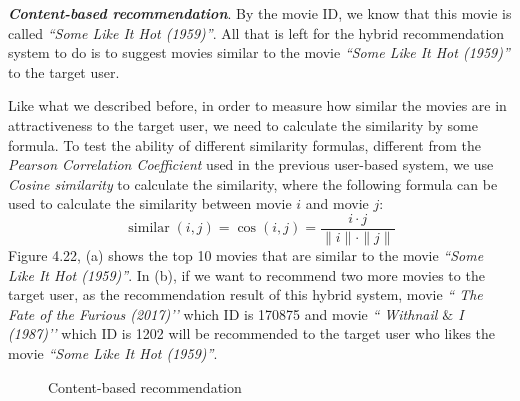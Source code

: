 \textbf{\textit{Content-based recommendation}}. By the movie ID, we know that this movie is called \textit{``Some Like It Hot (1959)''}. All that is left for the hybrid recommendation system to do is to suggest movies similar to the movie \textit{``Some Like It Hot (1959)''} to the target user. 

Like what we described before, in order to measure how similar the movies are in attractiveness to the target user, we need to calculate the similarity by some formula. To test the ability of different similarity formulas, different from the \textit{Pearson Correlation Coefficient} used in the previous user-based system, we use \textit{Cosine similarity} to calculate the similarity, where the following formula can be used to calculate the similarity between movie $i$ and movie $j$:
\begin{equation}
\operatorname{similar}(i, j)=\cos (i, j)=\frac{i \cdot j}{\|i\| \cdot\|j\|}
\end{equation}
Figure 4.22, (a) shows the top 10 movies that are similar to the movie \textit{``Some Like It Hot (1959)''}. In (b), if we want to recommend two more movies to the target user, as the recommendation result of this hybrid system, movie \textit{`` The Fate of the Furious (2017)’’} which ID is 170875 and movie \textit{`` Withnail $\&$ I (1987)’’} which ID is 1202 will be recommended to the target user who likes the movie \textit{``Some Like It Hot (1959)''}.

\begin{figure}[htbp]
\centering
{}%
%
\centering
\caption{Content-based recommendation}
\end{figure} 

